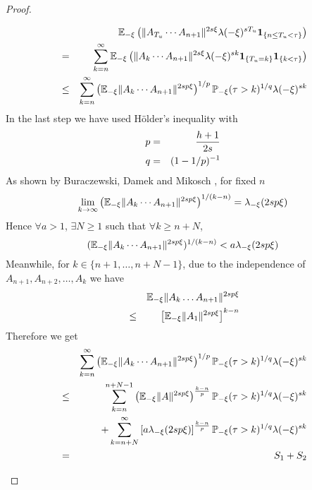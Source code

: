 \documentclass{article}
\theoremstyle{remark}
\begin{document}
\begin{proof}
\begin{enumerate}
\begin{enumerate}
      \begin{eqnarray*}
        && \mathbb{E}_{-\xi}\left(\|A_{T_u} \cdots A_{n+1}\|^{2s\xi}
          \lambda(-\xi)^{s T_u}
          \mathbf{1}_{\{n \leq T_u < \tau\}}\right) \\
        &=& \sum_{k=n}^\infty \mathbb{E}_{-\xi} \left(
          \|A_k \cdots A_{n+1}\|^{2s\xi}
          \lambda(-\xi)^{s k}
          \mathbf{1}_{\{T_u = k\}} \mathbf{1}_{\{k < \tau\}}\right)  \\
      &\leq& \sum_{k=n}^\infty
       \left(\mathbb{E}_{-\xi}
         \|A_k \cdots A_{n+1}\|^{2sp\xi}
       \right)^{1/p}
      \mathbb{P}_{-\xi}(\tau > k)^{1/q}
      \lambda(-\xi)^{sk}
      \end{eqnarray*}
      In the last step we have used H\"older's inequality with
      \begin{eqnarray*}
        p &=& {h + 1 \over 2s} \\
        q &=& (1 - 1/p)^{-1}
      \end{eqnarray*}
      As shown by Buraczewski, Damek
      and Mikosch \cite{BuraczewskiDamekMikosch2015}, for fixed $n$
      \[
      \lim_{k \to \infty}
      \left( \mathbb{E}_{-\xi}
        \|A_k \cdots A_{n+1}\|^{2sp\xi}
      \right)^{1/(k-n)} = \lambda_{-\xi}(2sp\xi)
      \]
      Hence $\forall a > 1$, $\exists N \geq 1$ such that $\forall k
      \geq n + N$,
      \[
      (\mathbb{E}_{-\xi}\|A_{k} \cdots A_{n+1}\|^{2sp\xi})^{1/(k-n)} <
      a \lambda_{-\xi}(2sp\xi)
      \]
      Meanwhile, for $k \in \{n+1, \dots, n+N-1\}$, due to the
      independence of $A_{n+1}, A_{n+2}, \dots, A_k$ we have
      \begin{eqnarray*}
        && \mathbb{E}_{-\xi} \|A_k \dots A_{n+1}\|^{2sp\xi} \\
        &\leq& \left[\mathbb{E}_{-\xi} \|A_1\|^{2sp\xi}\right]^{k-n}
      \end{eqnarray*}
      Therefore we get
      \begin{eqnarray*}
      && \sum_{k=n}^\infty
       \left(\mathbb{E}_{-\xi}
         \|A_k \cdots A_{n+1}\|^{2sp\xi}
       \right)^{1/p}
      \mathbb{P}_{-\xi}(\tau > k)^{1/q}
      \lambda(-\xi)^{sk} \\
      &\leq& \sum_{k=n}^{n+N-1} \left(
        \mathbb{E}_{-\xi} \|A\|^{2sp\xi}
      \right)^{k-n \over p} \mathbb{P}_{-\xi}(\tau > k)^{1/q}
      \lambda(-\xi)^{sk} \\
      && + \sum_{k=n+N}^\infty \left[
        a \lambda_{-\xi}(2sp\xi)
      \right]^{k-n \over p} \mathbb{P}_{-\xi}(\tau > k)^{1/q}
      \lambda(-\xi)^{sk} \\
      &=& S_1 + S_2
      \end{eqnarray*}

\end{enumerate}
\end{enumerate}
\end{proof}
\end{document}
